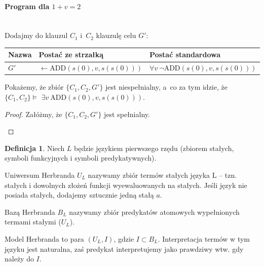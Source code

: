 \documentclass[10pt,a4paper]{article}
\theoremstyle{plain}
\theoremstyle{definition}
\newtheorem*{definition}{Definicja}
\begin{document}
\paragraph{Program dla $1+v = 2$}\mbox{}\\

Dodajmy do klauzul $C_1$ i~$C_2$ klauzulę celu $G'$:

\begin{center}\begin{tabular}{l | l | l}
  Nazwa & Postać ze strzałką & Postać standardowa \\
  \hline
  $G'$ & $\leftarrow \text{ADD}(s(0), v, s(s(0)))$ &
    $\forall v~\lnot \text{ADD}(s(0), v, s(s(0)))$ 
\end{tabular}\end{center}

Pokażemy, że zbiór $\lbrace C_1, C_2, G' \rbrace$ jest niespełnialny, a~co za tym
idzie, że $\lbrace C_1, C_2 \rbrace \models$\linebreak
$\exists v~\text{ADD}(s(0), v, s(s(0)))$.

\begin{proof}
  Załóżmy, że $\lbrace C_1, C_2, G' \rbrace$ jest spełnialny.

\begin{center}
\end{center}
\end{proof}

\begin{definition}
Niech $L$ będzie językiem pierwszego rzędu (zbiorem stałych, symboli funkcyjnych i symboli
predykatywnych).

Uniwersum Herbranda $U_L$ nazywamy zbiór termów stałych języka L -- tzn. stałych
i dowolnych złożeń funkcji wyewaluowanych na stałych. Jeśli język nie posiada stałych, dodajemy
sztucznie jedną stałą $a$.

Bazą Herbranda $B_L$ nazywamy zbiór predykatów atomowych wypełnionych termami stałymi ($U_L$).

Model Herbranda to para $(U_L, I)$, gdzie $I \subset B_L$. Interpretacja termów w tym języku
jest naturalna, zaś predykat interpretujemy jako prawdziwy wtw. gdy należy do $I$.
\end{definition}
\end{document}
